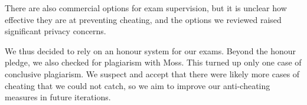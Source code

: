 There are also commercial options for exam supervision,
but it is unclear how effective they are at preventing cheating, and the options we reviewed raised significant privacy concerns.

We thus decided to rely on an honour system for our exams.
Beyond the honour pledge,
we also checked for plagiarism with Moss.
This turned up only one case of conclusive plagiarism.
We suspect and accept that there were likely more cases of cheating that we could not catch,
so we aim to improve our anti-cheating measures in future iterations.
